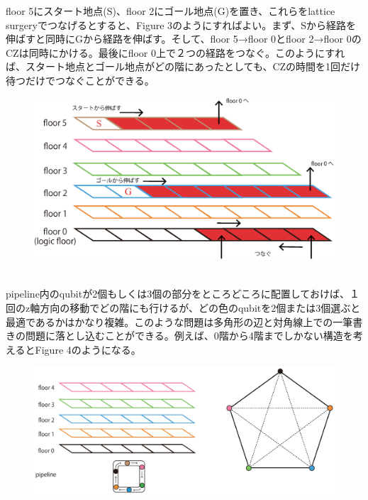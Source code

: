 \documentclass[a4paper,10.5pt]{ltjsarticle}
\begin{document}
\clearpage
floor 5にスタート地点(S)、floor 2にゴール地点(G)を置き、これらをlattice surgeryでつなげるとすると、Figure 3のようにすればよい。まず、Sから経路を伸ばすと同時にGから経路を伸ばす。そして、floor 5→floor 0とfloor 2→floor 0のCZは同時にかける。最後にfloor 0上で２つの経路をつなぐ。このようにすれば、スタート地点とゴール地点がどの階にあったとしても、CZの時間を1回だけ待つだけでつなぐことができる。\\
\begin{figure}[h]
  \centering
  \includegraphics[scale=0.6]{figure3.eps}
  \vspace{0pt}\caption{}
\end{figure}\\
pipeline内のqubitが2個もしくは3個の部分をところどころに配置しておけば、１回のz軸方向の移動でどの階にも行けるが、どの色のqubitを2個または3個選ぶと最適であるかはかなり複雑。このような問題は多角形の辺と対角線上での一筆書きの問題に落とし込むことができる。例えば、0階から4階までしかない構造を考えるとFigure 4のようになる。\\
\begin{figure}[h]
  \hspace{-80pt}\includegraphics[scale=0.55]{figure4.eps}
  \vspace{-30pt}\caption{}
\end{figure}\\
\end{document}
